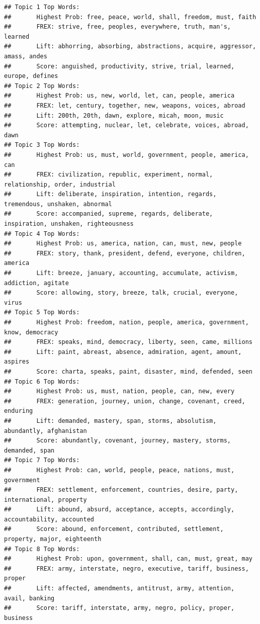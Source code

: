 \documentclass[
]{book}
\begin{document}
\begin{verbatim}
## Topic 1 Top Words:
##       Highest Prob: free, peace, world, shall, freedom, must, faith 
##       FREX: strive, free, peoples, everywhere, truth, man's, learned 
##       Lift: abhorring, absorbing, abstractions, acquire, aggressor, amass, andes 
##       Score: anguished, productivity, strive, trial, learned, europe, defines 
## Topic 2 Top Words:
##       Highest Prob: us, new, world, let, can, people, america 
##       FREX: let, century, together, new, weapons, voices, abroad 
##       Lift: 200th, 20th, dawn, explore, micah, moon, music 
##       Score: attempting, nuclear, let, celebrate, voices, abroad, dawn 
## Topic 3 Top Words:
##       Highest Prob: us, must, world, government, people, america, can 
##       FREX: civilization, republic, experiment, normal, relationship, order, industrial 
##       Lift: deliberate, inspiration, intention, regards, tremendous, unshaken, abnormal 
##       Score: accompanied, supreme, regards, deliberate, inspiration, unshaken, righteousness 
## Topic 4 Top Words:
##       Highest Prob: us, america, nation, can, must, new, people 
##       FREX: story, thank, president, defend, everyone, children, america 
##       Lift: breeze, january, accounting, accumulate, activism, addiction, agitate 
##       Score: allowing, story, breeze, talk, crucial, everyone, virus 
## Topic 5 Top Words:
##       Highest Prob: freedom, nation, people, america, government, know, democracy 
##       FREX: speaks, mind, democracy, liberty, seen, came, millions 
##       Lift: paint, abreast, absence, admiration, agent, amount, aspires 
##       Score: charta, speaks, paint, disaster, mind, defended, seen 
## Topic 6 Top Words:
##       Highest Prob: us, must, nation, people, can, new, every 
##       FREX: generation, journey, union, change, covenant, creed, enduring 
##       Lift: demanded, mastery, span, storms, absolutism, abundantly, afghanistan 
##       Score: abundantly, covenant, journey, mastery, storms, demanded, span 
## Topic 7 Top Words:
##       Highest Prob: can, world, people, peace, nations, must, government 
##       FREX: settlement, enforcement, countries, desire, party, international, property 
##       Lift: abound, absurd, acceptance, accepts, accordingly, accountability, accounted 
##       Score: abound, enforcement, contributed, settlement, property, major, eighteenth 
## Topic 8 Top Words:
##       Highest Prob: upon, government, shall, can, must, great, may 
##       FREX: army, interstate, negro, executive, tariff, business, proper 
##       Lift: affected, amendments, antitrust, army, attention, avail, banking 
##       Score: tariff, interstate, army, negro, policy, proper, business
\end{verbatim}
\end{document}
